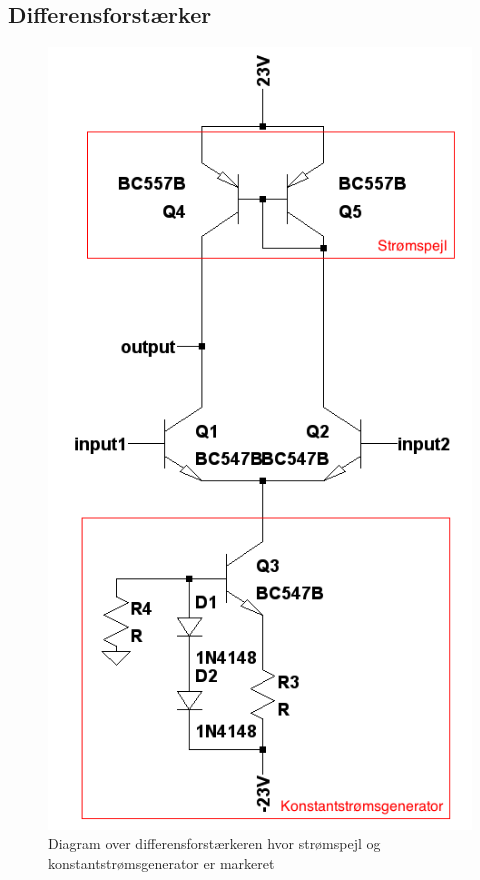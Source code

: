 \subsection{Differensforstærker}
\label{effekt_differensforstaerker}

\begin{figure}[h]
\centering
\includegraphics[scale=.4]{teknisk/effektforstaerker/differensforstaerker.png}
\caption{Diagram over differensforstærkeren hvor strømspejl og konstantstrømsgenerator er markeret}
\label{fig:differensforstaerker}
\end{figure}

